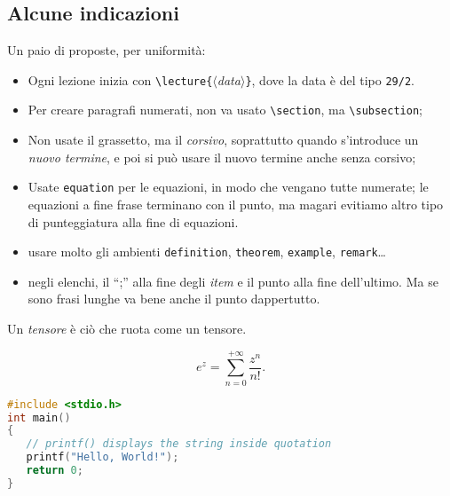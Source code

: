 

\subsection{Alcune indicazioni}

Un paio di proposte, per uniformità:
\begin{itemize}
\item Ogni lezione inizia con \lstinline|\lecture{|$\langle$\textit{data}$\rangle$\lstinline|}|, dove la data è del tipo \texttt{29/2}.
\item Per creare paragrafi numerati, non va usato \lstinline|\section|, ma \lstinline|\subsection|;
\item Non usate il grassetto, ma il \emph{corsivo}, soprattutto quando s'introduce un \emph{nuovo termine}, e poi si può usare il nuovo termine anche senza corsivo;
\item Usate \texttt{equation}  per le equazioni, in modo che vengano tutte numerate; le equazioni a fine frase terminano con il punto, ma magari evitiamo altro tipo di punteggiatura alla fine di equazioni.
\item usare molto gli ambienti \lstinline|definition|, \lstinline|theorem|, \lstinline|example|, \lstinline|remark|\dots
\item negli elenchi, il “;” alla fine degli \emph{item} e il punto alla fine dell'ultimo. Ma se sono frasi lunghe va bene anche il punto dappertutto.
\end{itemize}

\begin{definition}[Tensore]
Un \emph{tensore} è ciò che ruota come un tensore.
\end{definition}

\begin{equation}
e^{z}=\sum_{n=0}^{+\infty} \frac{z^n}{n!}.
\end{equation}

\begin{lstlisting}[language=C]
#include <stdio.h>
int main()
{
   // printf() displays the string inside quotation
   printf("Hello, World!");
   return 0;
}
\end{lstlisting}